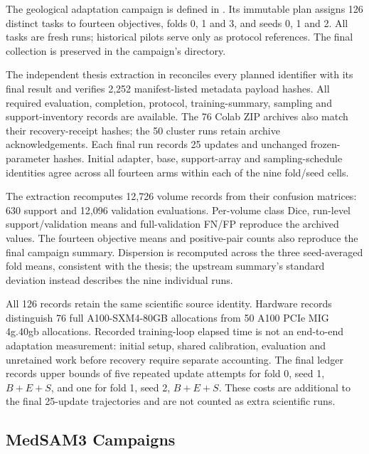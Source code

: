 The geological adaptation campaign is defined in
.
Its immutable plan assigns 126 distinct tasks to fourteen objectives,
folds 0, 1 and 3, and seeds 0, 1 and 2. All tasks are fresh runs;
historical pilots serve only as protocol references. The final
collection is preserved in the campaign's
 directory.

The independent thesis extraction in
 reconciles every planned
identifier with its final result and verifies 2,252 manifest-listed
metadata payload hashes. All required evaluation, completion, protocol,
training-summary, sampling and support-inventory records are available.
The 76 Colab ZIP archives also match their recovery-receipt hashes;
the 50 cluster runs retain archive acknowledgements. Each final run
records 25 updates and unchanged frozen-parameter hashes. Initial
adapter, base, support-array and sampling-schedule identities agree
across all fourteen arms within each of the nine fold/seed cells.

The extraction recomputes 12,726 volume records from their confusion
matrices: 630 support and 12,096 validation evaluations. Per-volume
class Dice, run-level support/validation means and full-validation
FN/FP reproduce the archived values. The fourteen objective means and
positive-pair counts also reproduce the final campaign summary.
Dispersion is recomputed across the three seed-averaged fold means,
consistent with the thesis; the upstream summary's standard deviation
instead describes the nine individual runs.

All 126 records retain the same scientific source identity. Hardware
records distinguish 76 full A100-SXM4-80GB allocations from 50 A100
PCIe MIG 4g.40gb allocations. Recorded training-loop elapsed time is
not an end-to-end adaptation measurement: initial setup, shared
calibration, evaluation and unretained work before recovery require
separate accounting. The final ledger records upper bounds of five
repeated update attempts for fold 0, seed 1, $B+E+S$, and one for
fold 1, seed 2, $B+E+S$. These costs are additional to the final
25-update trajectories and are not counted as extra scientific runs.

\subsection{MedSAM3 Campaigns}

